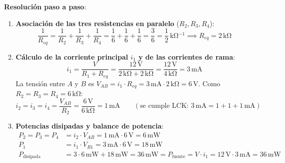 \begin{ejercicio}
\textbf{Resolución paso a paso}:
\begin{enumerate}
    \item \textbf{Asociación de las tres resistencias en paralelo} ($R_2, R_3, R_4$):
    \begin{equation*}
        \frac{1}{R_{eq}} = \frac{1}{R_2} + \frac{1}{R_3} + \frac{1}{R_4} = \frac{1}{6} + \frac{1}{6} + \frac{1}{6} = \frac{3}{6} = \frac{1}{2}\,\si{\kilo\ohm^{-1}} \implies \boxed{R_{eq} = 2\,\si{\kilo\ohm}}
    \end{equation*}
    \item \textbf{Cálculo de la corriente principal $i_1$ y de las corrientes de rama}:
    \begin{equation*}
        i_1 = \frac{V}{R_1 + R_{eq}} = \frac{12\,\si{\volt}}{2\,\si{\kilo\ohm} + 2\,\si{\kilo\ohm}} = \frac{12\,\si{\volt}}{4\,\si{\kilo\ohm}} = 3\,\si{\milli\ampere}
    \end{equation*}
    La tensión entre $A$ y $B$ es $V_{AB} = i_1 \cdot R_{eq} = 3\,\si{\milli\ampere} \cdot 2\,\si{\kilo\ohm} = 6\,\si{\volt}$. Como $R_2 = R_3 = R_4 = 6\,\si{\kilo\ohm}$:
    \begin{equation*}
        i_2 = i_3 = i_4 = \frac{V_{AB}}{R_2} = \frac{6\,\si{\volt}}{6\,\si{\kilo\ohm}} = 1\,\si{\milli\ampere} \qquad (\text{se cumple LCK: } 3\,\si{\milli\ampere} = 1 + 1 + 1\,\si{\milli\ampere})
    \end{equation*}
    \item \textbf{Potencias disipadas y balance de potencia}:
    \begin{align*}
        P_2 = P_3 = P_4 &= i_2 \cdot V_{AB} = 1\,\si{\milli\ampere} \cdot 6\,\si{\volt} = 6\,\si{\milli\watt} \\
        P_1 &= i_1 \cdot V_{R1} = 3\,\si{\milli\ampere} \cdot 6\,\si{\volt} = 18\,\si{\milli\watt} \\
        P_{\text{disipada}} &= 3\cdot 6\,\si{\milli\watt} + 18\,\si{\milli\watt} = 36\,\si{\milli\watt} = P_{\text{fuente}} = V\cdot i_1 = 12\,\si{\volt}\cdot 3\,\si{\milli\ampere} = \boxed{36\,\si{\milli\watt}}
    \end{align*}
\end{enumerate}
\end{ejercicio}

